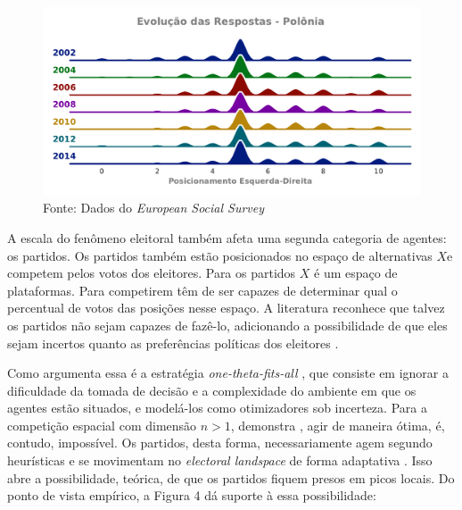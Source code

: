 \begin{figure}[H]
  \centering \includegraphics[scale = 0.8]{ims/ess_Pol_plots.pdf}
  Fonte: Dados do \textit{European Social Survey}
\end{figure}



A escala do fenômeno eleitoral também afeta uma segunda categoria de agentes: os
partidos. Os partidos também estão posicionados no espaço de alternativas \(X\)e
competem pelos votos dos eleitores. Para os partidos \(X\) é um espaço de
plataformas. Para competirem têm de ser capazes de determinar qual o percentual
de votos das posições nesse espaço. A literatura reconhece que talvez os
partidos não sejam capazes de fazê-lo, adicionando a possibilidade de que eles
sejam incertos quanto as preferências políticas dos eleitores
\cite{glazer1989model, grofman2004downs}.


Como argumenta  essa é a estratégia
\textit{one-theta-fits-all} , que consiste em ignorar a dificuldade da tomada de
decisão e a complexidade do ambiente em que os agentes estão situados, e
modelá-los como otimizadores sob incerteza. Para a competição espacial com
dimensão $n>1$, demonstra , agir de maneira
ótima, é, contudo, impossível. Os partidos, desta forma, necessariamente agem
segundo heurísticas e se movimentam no \textit{electoral landspace} de forma
adaptativa \cite{kollman1998political, de1999adaptive}. Isso abre a
possibilidade, teórica, de que os partidos fiquem presos em picos locais. Do
ponto de vista empírico, a Figura 4 dá suporte à essa possibilidade:

